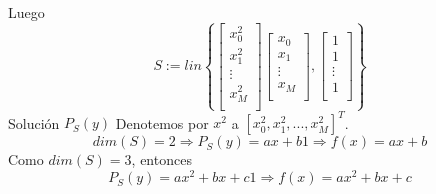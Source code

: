 \begin{ejemplo}
Luego
\[ S:= lin \left\lbrace \begin{bmatrix}
x_0^2 \\
x_1^2 \\
\vdots \\
x_M^2 \\
\end{bmatrix}
\begin{bmatrix}
x_0 \\
x_1 \\
\vdots \\
x_M \\
\end{bmatrix}
, \begin{bmatrix}
1 \\
1 \\
\vdots \\
1 \\
\end{bmatrix}
\right\rbrace \]
Solución $P_S(y)$
Denotemos por $x^2$ a $[ x_0^2, x_1^2, ..., x_M^2 ]^T$.
\[ dim(S) = 2 \Rightarrow P_S(y) = ax + b1 \Rightarrow f(x) = ax+b \]
Como $dim(S) = 3$, entonces
\[ P_S(y) = ax^2 + bx + c1 \Rightarrow f(x) = ax^2 + bx + c \] 
\end{ejemplo}

